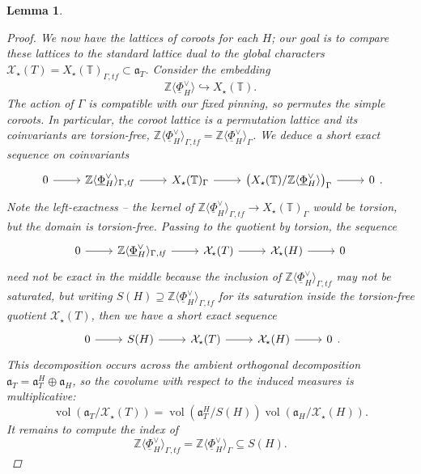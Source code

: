 \documentclass[openany]{amsbook}
\newtheorem{lemma}[theorem]{Lemma}
\theoremstyle{definition}
\theoremstyle{remark}
\numberwithin{equation}{section}
\newcommand{\Z}{\mathbb{Z}}
\newcommand{\T}{\mathbb{T}}
\newcommand{\cX}{\mathcal{X}}
\newcommand{\ul}[1]{\underline{#1}}
\newcommand{\vol}{\operatorname{vol}}
\renewcommand{\-}{\operatorname{-}}
\renewcommand{\a}{\mathfrak{a}}
\newcommand{\tf}{\mathit{tf}}
\begin{document}
\begin{lemma}
\begin{proof}
        We now have the lattices of coroots for each $H$; our goal is to compare these lattices to the standard lattice dual to the global characters $\cX_{\star}(T) = X_\star(\T)_{\Gamma, \tf} \subset \a_{T}$. Consider the embedding
        $$
            \Z\langle \ul{\Phi}^\vee_{H} \rangle \hookrightarrow X_\star(\T).
        $$
        The action of $\Gamma$ is compatible with our fixed pinning, so permutes the simple coroots. In particular, the coroot lattice is a permutation lattice and its coinvariants are torsion-free, $\Z \langle \ul{\Phi}^\vee_{H} \rangle_{\Gamma, \tf} = \Z \langle \ul{\Phi}^\vee_{H} \rangle_{\Gamma}$. We deduce a short exact sequence on coinvariants 
        $$
            \begin{tikzcd}[ampersand replacement=\&]
            0 \ar[r] \& \Z\langle \ul{\Phi}^\vee_{H} \rangle_{\Gamma, \tf} \ar[r] \& X_\star(\T)_{\Gamma} \ar[r] \& \left(X_\star(\T)/\Z\langle \ul{\Phi}^\vee_{H} \rangle\right)_{\Gamma} \ar[r] \& 0
            \end{tikzcd}.
        $$
        Note the left-exactness -- the kernel of $\Z \langle \ul{\Phi}^\vee_{H} \rangle_{\Gamma, \tf} \to X_\star(\T)_{\Gamma}$ would be torsion, but the domain is torsion-free. Passing to the quotient by torsion, the sequence 
        $$
            \begin{tikzcd}[ampersand replacement=\&]
             0 \ar[r] \& \Z\langle \ul{\Phi}^\vee_{H} \rangle_{\Gamma, \tf} \ar[r] \& \cX_\star(T) \ar[r] \& \cX_\star(H) \ar[r] \& 0
            \end{tikzcd}
        $$
        need not be exact in the middle because the inclusion of $\Z\langle \ul{\Phi}^\vee_{H} \rangle_{\Gamma, \tf}$ may not be saturated, but writing $S(H) \supseteq \Z\langle \ul{\Phi}^\vee_{H} \rangle_{\Gamma, \tf}$ for its saturation inside the torsion-free quotient $\cX_\star(T)$, then we have a short exact sequence
        $$
            \begin{tikzcd} 0 \ar[r] & S(H) \ar[r] & \cX_\star(T) \ar[r] & \cX_\star(H) \ar[r] & 0
            \end{tikzcd}. 
        $$
        This decomposition occurs across the ambient orthogonal decomposition $\a_T = \a_T^H \oplus \a_H$, so the covolume with respect to the induced measures is multiplicative:
        $$
            \vol(\a_T/\cX_\star(T)) = \vol(\a_T^H/S(H)) \vol(\a_H/\cX_\star(H)).
        $$
        It remains to compute the index of $$\Z\langle \ul{\Phi}^\vee_{H} \rangle_{\Gamma, \tf} = \Z\langle \ul{\Phi}^\vee_{H} \rangle_{\Gamma} \subseteq S(H).$$

\end{proof}
\end{lemma}
\end{document}
